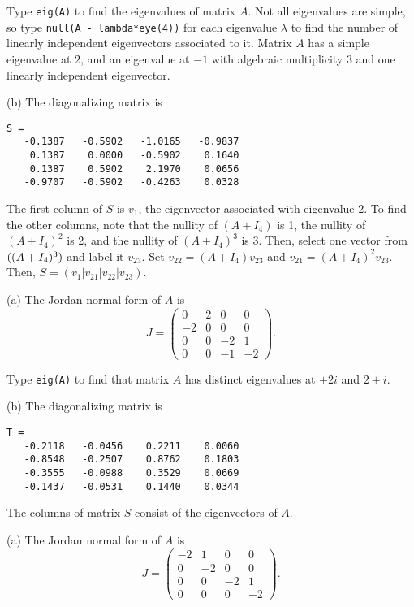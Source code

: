 \documentclass{ximera}
\begin{document}
\soln Type {\tt eig(A)} to find the eigenvalues of matrix $A$.  Not all
eigenvalues are simple, so type {\tt null(A - lambda*eye(4))} for each
eigenvalue $\lambda$ to find the number of linearly independent eigenvectors
associated to it.  Matrix $A$ has a simple eigenvalue at $2$, and
an eigenvalue at $-1$ with algebraic multiplicity 3 and one linearly
independent eigenvector.

(b) \ans   The diagonalizing matrix is
\begin{verbatim}
S =
   -0.1387   -0.5902   -1.0165   -0.9837
    0.1387    0.0000   -0.5902    0.1640
    0.1387    0.5902    2.1970    0.0656
   -0.9707   -0.5902   -0.4263    0.0328
\end{verbatim}

\soln The first column of $S$ is $v_1$, the eigenvector associated with
eigenvalue $2$.  To find the other columns, note that the nullity of
$(A + I_4)$ is 1, the nullity of $(A + I_4)^2$ is 2, and the nullity of
$(A + I_4)^3$ is 3.  Then, select one vector from $\null((A + I_4)^3)$
and label it $v_{23}$.  Set $v_{22} = (A + I_4)v_{23}$ and
$v_{21} = (A + I_4)^2v_{23}$.  Then, $S = (v_1|v_{21}|v_{22}|v_{23})$.

(a) \ans The Jordan normal form of $A$ is
\[
J = \left(\begin{array}{rrrr}
 0 & 2 &  0 &  0 \\
-2 & 0 &  0 &  0 \\
 0 & 0 & -2 &  1 \\
 0 & 0 & -1 & -2 \end{array}\right).
\]

\soln Type {\tt eig(A)} to find that matrix $A$ has distinct eigenvalues
at $\pm 2i$ and $2 \pm i$.

(b) \ans   The diagonalizing matrix is
\begin{verbatim}
T =
   -0.2118   -0.0456    0.2211    0.0060
   -0.8548   -0.2507    0.8762    0.1803
   -0.3555   -0.0988    0.3529    0.0669
   -0.1437   -0.0531    0.1440    0.0344
\end{verbatim}

\soln The columns of matrix $S$ consist of the eigenvectors of $A$.


(a) \ans The Jordan normal form of $A$ is
\[
J = \left(\begin{array}{rrrr}
-2 & 1 & 0 & 0 \\
0 & -2 & 0 & 0 \\
0 & 0 & -2 & 1 \\
0 & 0 & 0 & -2 \end{array}\right).
\]
\end{document}
